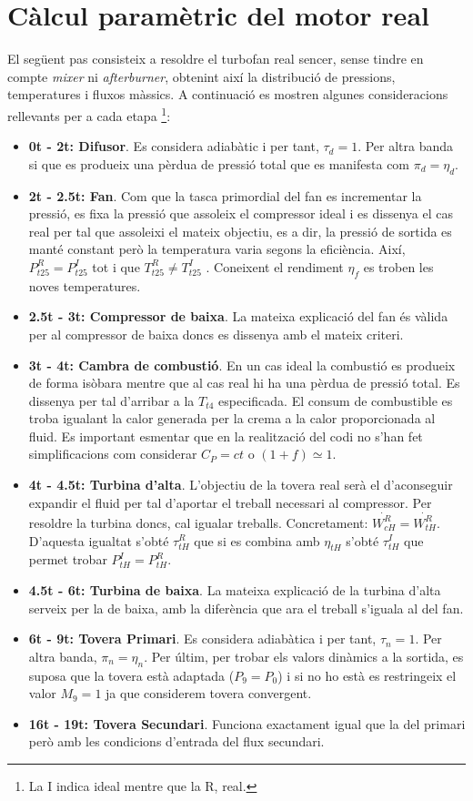 \section{Càlcul paramètric del motor real}
El següent pas consisteix a resoldre el turbofan real sencer, sense tindre en compte \textit{mixer} ni \textit{afterburner}, obtenint així la distribució de pressions, temperatures i fluxos màssics. A continuació es mostren algunes consideracions rellevants per a cada etapa \footnote{La I indica ideal mentre que la R, real.}:
\begin{itemize}
\item \textbf{0t - 2t: Difusor}. Es considera adiabàtic i per tant, $\tau_d = 1$. Per altra banda si que es produeix una pèrdua de pressió total que es manifesta com $\pi_d = \eta_d$.
\item \textbf{2t - 2.5t: Fan}. Com que la tasca primordial del fan es incrementar la pressió, es fixa la pressió que assoleix el compressor ideal i es dissenya el cas real per tal que assoleixi el mateix objectiu, es a dir, la pressió de sortida es manté constant però la temperatura varia segons la eficiència. Així, $P_{t25}^R = P_{t25}^I$ tot i que $T_{t25}^R \neq T_{t25}^I$ . Coneixent el rendiment $\eta_f$ es troben les noves temperatures.
\item \textbf{2.5t - 3t: Compressor de baixa}. La mateixa explicació del fan és vàlida per al compressor de baixa doncs es dissenya amb el mateix criteri.
\item \textbf{3t - 4t: Cambra de combustió}. En un cas ideal la combustió es produeix de forma isòbara mentre que al cas real hi ha una pèrdua de pressió total. Es dissenya per tal d'arribar a la $T_{t4}$ especificada. El consum de combustible es troba igualant la calor generada per la crema a la calor proporcionada al fluid. Es important esmentar que en la realització del codi no s'han fet simplificacions com considerar $C_P=ct$ o $(1+f)\simeq1$.
\item \textbf{4t - 4.5t: Turbina d'alta}. L'objectiu de la tovera real serà el d'aconseguir expandir el fluid per tal d'aportar el treball necessari al compressor. Per resoldre la turbina doncs, cal igualar treballs. Concretament: $\dot{W_{cH}^R} = \dot{W_{tH}^R} $. D'aquesta igualtat s'obté $\tau_{tH}^R$ que si es combina amb $\eta_{tH}$ s'obté $\tau_{tH}^I$ que permet trobar  $P_{tH}^{I} = P_{tH}^{R}$.
\item \textbf{4.5t - 6t: Turbina de baixa}. La mateixa explicació de la turbina d'alta serveix per la de baixa, amb la diferència que ara el treball s'iguala al del fan.
\item \textbf{6t - 9t: Tovera Primari}. Es considera adiabàtica i per tant, $\tau_n = 1$. Per altra banda, $\pi_n = \eta_n$. Per últim, per trobar els valors dinàmics a la sortida, es suposa que la tovera està adaptada ($P_9 = P_0$) i si no ho està es restringeix el valor $M_9=1$ ja que considerem tovera convergent.
\item \textbf{16t - 19t: Tovera Secundari}. Funciona exactament igual que la del primari però amb les condicions d'entrada del flux secundari.
\end{itemize}

